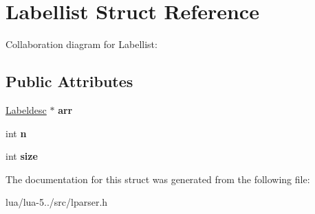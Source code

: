 \hypertarget{struct_labellist}{\section{Labellist Struct Reference}
\label{struct_labellist}
}


Collaboration diagram for Labellist\+:
\subsection*{Public Attributes}
\begin{DoxyCompactItemize}
\item 
\hypertarget{struct_labellist_a330c4161f41ef91c4f4e730e50d75b34}{\hyperlink{struct_labeldesc}{Labeldesc} $\ast$ {\bfseries arr}}\label{struct_labellist_a330c4161f41ef91c4f4e730e50d75b34}

\item 
\hypertarget{struct_labellist_a68f90673b9dc53b9a816bc981525f2a8}{int {\bfseries n}}\label{struct_labellist_a68f90673b9dc53b9a816bc981525f2a8}

\item 
\hypertarget{struct_labellist_a2d0f72da42c57cfdbf8a19b9929b50cc}{int {\bfseries size}}\label{struct_labellist_a2d0f72da42c57cfdbf8a19b9929b50cc}

\end{DoxyCompactItemize}


The documentation for this struct was generated from the following file\+:\begin{DoxyCompactItemize}
\item 
lua/lua-\/5../src/lparser.\+h\end{DoxyCompactItemize}
